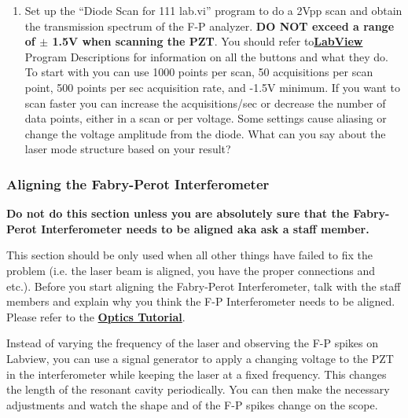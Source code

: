\documentclass{../lab}
\begin{document}
\begin{enumerate}
    \item Set up the ``Diode Scan for 111 lab.vi'' program to do a 2Vpp scan and obtain the transmission spectrum of the F-P analyzer. \textbf{DO NOT exceed a range of $\pm$ 1.5V when scanning the PZT}. You should refer to\href{http://experimentationlab.berkeley.edu/node/119}{\textbf{}}\href{http://experimentationlab.berkeley.edu/node/119}{\textbf{LabView}} Program Descriptions for information on all the buttons and what they do. To start with you can use 1000 points per scan, 50 acquisitions per scan point, 500 points per sec acquisition rate, and -1.5V minimum. If you want to scan faster you can increase the acquisitions/sec or decrease the number of data points, either in a scan or per voltage. Some settings cause aliasing or change the voltage amplitude from the diode. What can you say about the laser mode structure based on your result?

\end{enumerate}

\subsubsection{Aligning the Fabry-Perot Interferometer}

\textbf{Do not do this section unless you are absolutely sure that the Fabry-Perot Interferometer needs to be aligned aka ask a staff member.}

This section should be only used when all other things have failed to fix the problem (i.e. the laser beam is aligned, you have the proper connections and etc.). Before you start aligning the Fabry-Perot Interferometer, talk with the staff members and explain why you think the F-P Interferometer needs to be aligned. Please refer to the \href{http://experimentationlab.berkeley.edu/OpticsTutorial}{\textbf{Optics Tutorial}}.

Instead of varying the frequency of the laser and observing the F-P spikes on Labview, you can use a signal generator to apply a changing voltage to the PZT in the interferometer while keeping the laser at a fixed frequency. This changes the length of the resonant cavity periodically. You can then make the necessary adjustments and watch the shape and of the F-P spikes change on the scope.
\end{document}
